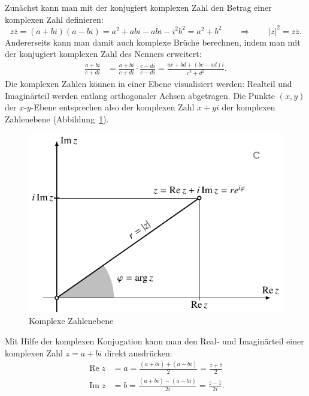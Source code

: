 Zunächst kann man mit der konjugiert komplexen Zahl den Betrag einer
komplexen Zahl definieren:
\[
z\bar z=(a+bi)(a-bi)=a^2+abi-abi-i^2b^2=a^2+b^2\qquad\Rightarrow\qquad
|z|^2=z\bar z.
\]
Andererseits kann man damit auch komplexe Brüche berechnen, indem man
mit der konjugiert komplexen Zahl des Nenners erweitert:
\begin{align*}
\frac{a+bi}{c+di}&=
\frac{a+bi}{c+di}
\cdot
\frac{c-di}{c-di}=\frac{ac+bd+(bc-ad)i}{c^2+d^2}.
\end{align*}
Die komplexen Zahlen können in einer Ebene visualisiert werden: 
Realteil und Imaginärteil werden entlang orthogonaler Achsen abgetragen.
Die Punkte $(x,y)$ der $x$-$y$-Ebene entsprechen also der komplexen Zahl
$x+yi$ der komplexen Zahlenebene (Abbildung~\ref{skript:gaussebene}).
\begin{figure}
\centering
\includegraphics{chapters/a-komplex/gauss.pdf}
\caption{Komplexe Zahlenebene
\label{skript:gaussebene}}
\end{figure}
%
%

Mit Hilfe der komplexen Konjugation kann man den Real- und Imaginärteil
einer komplexen Zahl $z=a+bi$ direkt ausdrücken:
\begin{align}
\operatorname{Re}z 
&=
a=\frac{(a+bi)+(a-bi)}2=\frac{z+\bar z}2
\label{skript:realteil-formel}
\\
\operatorname{Im}z
&=
b=\frac{(a+bi)-(a-bi)}{2i}=\frac{z-\bar z}{2i}.
\label{skript:imaginaerteil-formel}
\end{align}

